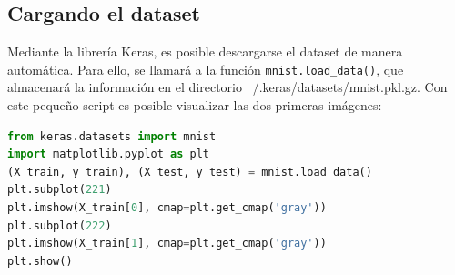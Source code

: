 \subsection{Cargando el dataset}
Mediante la librería Keras, es posible descargarse el dataset de manera automática. Para ello, se llamará a la función \lstinline{mnist.load_data()}, que almacenará la información en el directorio ~/.keras/datasets/mnist.pkl.gz. Con este pequeño script es posible visualizar las dos primeras imágenes:
\begin{lstlisting}[language=Python]
from keras.datasets import mnist
import matplotlib.pyplot as plt
(X_train, y_train), (X_test, y_test) = mnist.load_data()
plt.subplot(221)
plt.imshow(X_train[0], cmap=plt.get_cmap('gray'))
plt.subplot(222)
plt.imshow(X_train[1], cmap=plt.get_cmap('gray'))
plt.show()
\end{lstlisting}


